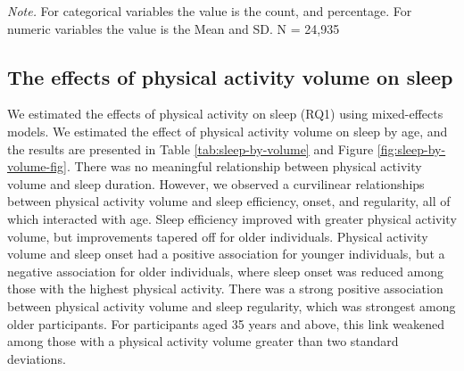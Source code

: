 \documentclass[
  man]{apa6}
\begin{document}
\begin{table}[tbp]
\begin{center}
\begin{threeparttable}
\begin{tablenotes}[para]
\normalsize{\textit{Note.} For categorical variables the value is the count, and percentage. For numeric variables the value is the Mean and SD. N = 24,935}
\end{tablenotes}

\end{threeparttable}
\end{center}

\end{table}

\hypertarget{the-effects-of-physical-activity-volume-on-sleep}{%
\subsection{The effects of physical activity volume on sleep}\label{the-effects-of-physical-activity-volume-on-sleep}}

We estimated the effects of physical activity on sleep (RQ1) using mixed-effects models. We estimated the effect of physical activity volume on sleep by age, and the results are presented in Table \ref{tab:sleep-by-volume} and Figure \ref{fig:sleep-by-volume-fig}. There was no meaningful relationship between physical activity volume and sleep duration. However, we observed a curvilinear relationships between physical activity volume and sleep efficiency, onset, and regularity, all of which interacted with age. Sleep efficiency improved with greater physical activity volume, but improvements tapered off for older individuals. Physical activity volume and sleep onset had a positive association for younger individuals, but a negative association for older individuals, where sleep onset was reduced among those with the highest physical activity. There was a strong positive association between physical activity volume and sleep regularity, which was strongest among older participants. For participants aged 35 years and above, this link weakened among those with a physical activity volume greater than two standard deviations.
\end{document}
